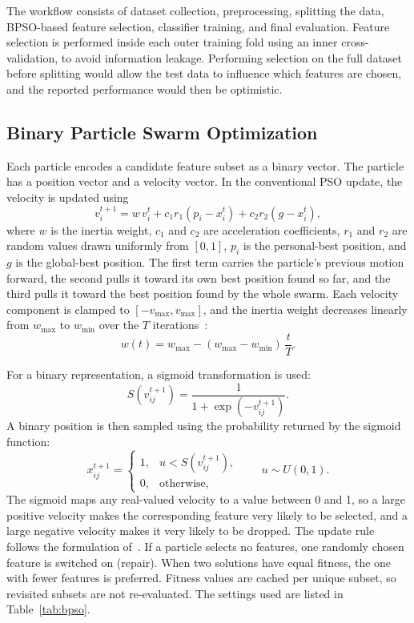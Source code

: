 \documentclass[conference]{IEEEtran}
\begin{document}
The workflow consists of dataset collection, preprocessing, splitting the
data, BPSO-based feature selection, classifier training, and final
evaluation. Feature selection is performed inside each outer training fold
using an inner cross-validation, to avoid information leakage. Performing
selection on the full dataset before splitting would allow the test data to
influence which features are chosen, and the reported performance would then
be optimistic.

\subsection{Binary Particle Swarm Optimization}

Each particle encodes a candidate feature subset as a binary vector. The
particle has a position vector and a velocity vector. In the conventional PSO
update, the velocity is updated using
\begin{equation}
v_i^{t+1} = w\,v_i^{t} + c_1 r_1 (p_i - x_i^{t}) + c_2 r_2 (g - x_i^{t}),
\label{eq:velocity}
\end{equation}
where $w$ is the inertia weight, $c_1$ and $c_2$ are acceleration
coefficients, $r_1$ and $r_2$ are random values drawn uniformly from $[0,1]$,
$p_i$ is the personal-best position, and $g$ is the global-best position. The
first term carries the particle's previous motion forward, the second pulls it
toward its own best position found so far, and the third pulls it toward the
best position found by the whole swarm. Each velocity component is clamped to
$[-v_{\max}, v_{\max}]$, and the inertia weight decreases linearly from
$w_{\max}$ to $w_{\min}$ over the $T$ iterations~\cite{shi1998}:
\begin{equation}
w(t) = w_{\max} - (w_{\max} - w_{\min})\,\frac{t}{T}.
\end{equation}

For a binary representation, a sigmoid transformation is used:
\begin{equation}
S(v_{ij}^{t+1}) = \frac{1}{1+\exp(-v_{ij}^{t+1})}.
\end{equation}
A binary position is then sampled using the probability returned by the
sigmoid function:
\begin{equation}
x_{ij}^{t+1} =
\begin{cases}
1, & u < S(v_{ij}^{t+1}),\\
0, & \text{otherwise},
\end{cases}
\qquad u \sim U(0,1).
\end{equation}
The sigmoid maps any real-valued velocity to a value between 0 and 1, so a
large positive velocity makes the corresponding feature very likely to be
selected, and a large negative velocity makes it very likely to be dropped.
The update rule follows the formulation of~\cite{kennedy1997}. If a particle
selects no features, one randomly chosen feature is switched on (repair).
When two solutions have equal fitness, the one with fewer features is
preferred. Fitness values are cached per unique subset, so revisited subsets
are not re-evaluated. The settings used are listed in
Table~\ref{tab:bpso}.
\end{document}
